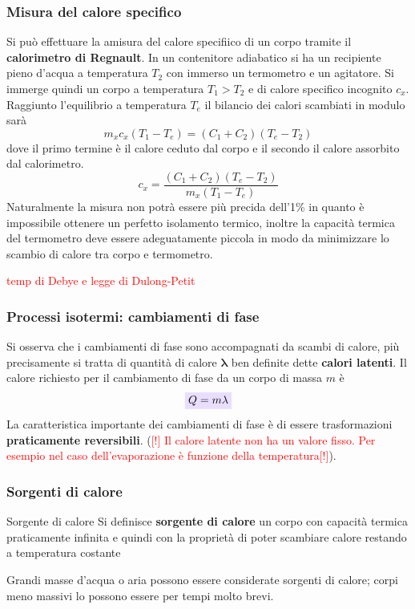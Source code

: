 \documentclass[x11names]{article}
\newcommand{\viola}[1]{\colorbox{myred}{$\displaystyle #1$}}
\begin{document}
	\subsubsection{Misura del calore specifico}
	Si può effettuare la amisura del calore specifiico di un corpo tramite il \textbf{calorimetro di Regnault}. In un contenitore adiabatico si ha un recipiente pieno d'acqua a temperatura \(T_2\) con immerso un termometro e un agitatore. Si immerge quindi un corpo a temperatura \(T_1 > T_2\) e di calore specifico incognito \(c_x\). Raggiunto l'equilibrio a temperatura \(T_e\) il bilancio dei calori scambiati in modulo sarà
	\[ 
	m_xc_x(T_1 - T_e) = (C_1 + C_2)(T_e - T_2)
	\]
	dove il primo termine è il calore ceduto dal corpo e il secondo il calore assorbito dal calorimetro.
	\[ 
	c_x = \frac{(C_1 + C_2)(T_e - T_2)}{m_x(T_1 - T_e)}
	\]
	Naturalmente la misura non potrà essere più precida dell'1\% in quanto è impossibile ottenere un perfetto isolamento termico, inoltre la capacità termica del termometro deve essere adeguatamente piccola  in modo da minimizzare lo scambio di calore tra corpo e termometro.
	
	
	\begin{center}
		\textcolor{red}{temp di Debye e legge di Dulong-Petit}
	\end{center}
	
	\subsubsection{Processi isotermi: cambiamenti di fase}
	Si osserva che i cambiamenti di fase sono accompagnati da scambi di calore, più precisamente si tratta di quantità di calore \(\boldsymbol{\lambda}\) ben definite dette  \textbf{calori latenti}. Il calore richiesto per il cambiamento di fase da un corpo di massa \(m\) è 
	\begin{equation}\label{calorelatente}
	\viola{	Q = m\lambda}
	\end{equation}
	La caratteristica importante dei cambiamenti di fase è di essere trasformazioni \textbf{praticamente reversibili}.
	(\textcolor{red}{[!] Il calore latente non ha un valore fisso. Per esempio nel caso dell'evaporazione è funzione della temperatura[!]}).
	
	\subsubsection{Sorgenti di calore}
	\begin{center}
		\colorbox{myblue}{\begin{minipage}{5.75in}
				\begin{blues}{Sorgente di calore}
					Si definisce \textbf{sorgente di calore} un corpo con capacità termica praticamente infinita e quindi con la proprietà di poter scambiare calore restando a temperatura costante
				\end{blues}
		\end{minipage}}
	\end{center}
	Grandi masse d'acqua o aria possono essere considerate sorgenti di calore; corpi meno massivi lo possono essere per tempi molto brevi.\\
	
\end{document}
